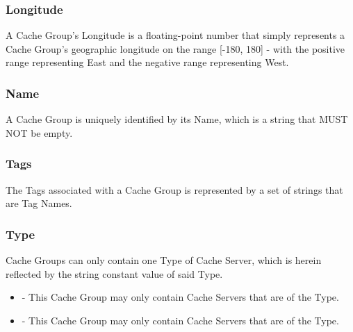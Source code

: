 \subsubsection{Longitude}
A Cache Group's Longitude is a floating-point number that simply represents a
Cache Group's geographic longitude on the range [-180, 180] - with the positive
range representing East and the negative range representing West.

\subsubsection{Name}
A Cache Group is uniquely identified by its Name, which is a string that MUST
NOT be empty.

\subsubsection{Tags}
The Tags associated with a Cache Group is represented by a set of strings that
are Tag Names.

\subsubsection{Type}
Cache Groups can only contain one Type of Cache Server, which is herein
reflected by the string constant value of said Type.

\begin{itemize}
	\item {} - This Cache Group may only contain Cache Servers that
		are of the  Type.
	\item {} - This Cache Group may only contain Cache Servers that are
		of the  Type.
\end{itemize}
